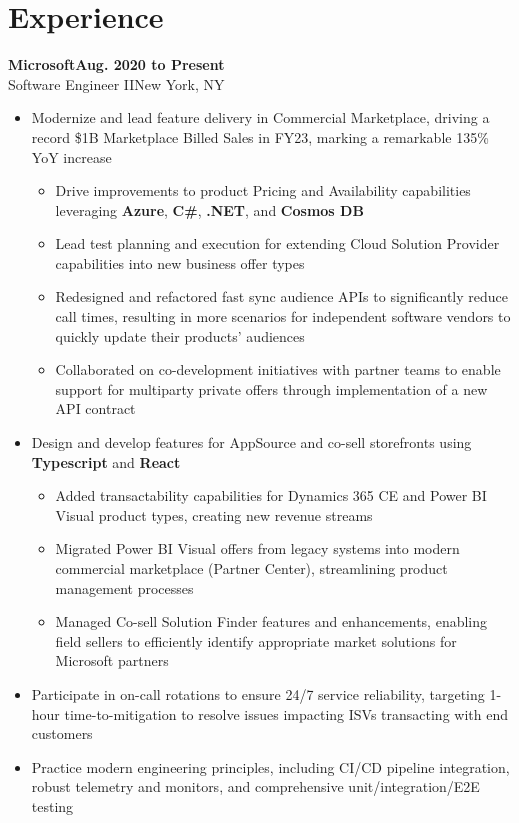 \documentclass[9pt]{extarticle}
\newcommand{\experiencesubsection}[4]{
    \vspace{0.75em}\Large\textbf{#1\hfill{#4}}\\{#2}\hfill{#3}\normalsize
}
\begin{document}
\hfill\begin{minipage}[t]{.7\textwidth}  %
    \section{Experience}
    \experiencesubsection{Microsoft}{Software Engineer II}{New York, NY}{Aug. 2020 to Present}
    \begin{itemize}
        \setlength\itemsep{1dd}
        \item Modernize and lead feature delivery in Commercial Marketplace, driving a record \$1B Marketplace Billed Sales in FY23, marking a remarkable 135\% YoY increase
            \begin{itemize}[topsep=0pt]
                \setlength\itemsep{1dd}
                \item Drive improvements to product Pricing and Availability capabilities leveraging \textbf{Azure}, \textbf{C\#}, \textbf{.NET}, and \textbf{Cosmos DB}
                \item Lead test planning and execution for extending Cloud Solution Provider capabilities into new business offer types
                \item Redesigned and refactored fast sync audience APIs to significantly reduce call times, resulting in more scenarios for independent
                    software vendors to quickly update their products' audiences
                \item Collaborated on co-development initiatives with partner teams to enable support for multiparty private offers through implementation of a new API contract
            \end{itemize}
        \item Design and develop features for AppSource and co-sell storefronts using \textbf{Typescript} and \textbf{React}
            \begin{itemize}[topsep=0pt]
                \setlength\itemsep{1dd}
                \item Added transactability capabilities for Dynamics 365 CE and Power BI Visual product types, creating new revenue streams
                \item Migrated Power BI Visual offers from legacy systems into modern commercial marketplace (Partner Center), streamlining product management processes
                \item Managed Co-sell Solution Finder features and enhancements, enabling field sellers to efficiently identify appropriate market solutions for Microsoft partners
            \end{itemize}
        \item Participate in on-call rotations to ensure 24/7 service reliability, targeting 1-hour time-to-mitigation to resolve issues impacting ISVs transacting with end customers
        \item Practice modern engineering principles, including CI/CD pipeline integration, robust telemetry and monitors, and comprehensive unit/integration/E2E testing 
    \end{itemize}


\end{minipage}
\end{document}
